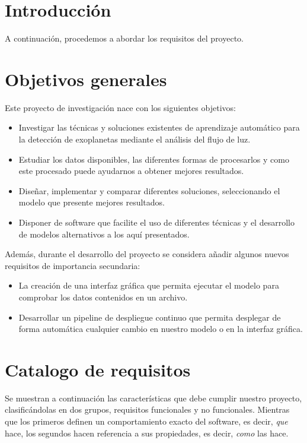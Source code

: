 
\section{Introducción}

A continuación, procedemos a abordar los requisitos del proyecto.

\section{Objetivos generales}

Este proyecto de investigación nace con los siguientes objetivos:

\begin{itemize}
    \item Investigar las técnicas y soluciones existentes de aprendizaje automático para la detección de exoplanetas mediante el análisis del flujo de luz.    
    \item Estudiar los datos disponibles, las diferentes formas de procesarlos y como este procesado puede ayudarnos a obtener mejores resultados.
    \item Diseñar, implementar y comparar diferentes soluciones, seleccionando el modelo que presente mejores resultados.
    \item Disponer de software que facilite el uso de diferentes técnicas y el desarrollo de modelos alternativos a los aquí presentados.
\end{itemize}

Además, durante el desarrollo del proyecto se considera añadir algunos nuevos requisitos de importancia secundaria:

\begin{itemize}    
    \item La creación de una interfaz gráfica que permita ejecutar el modelo para comprobar los datos contenidos en un archivo.
    \item Desarrollar un pipeline de despliegue continuo que permita desplegar de forma automática cualquier cambio en nuestro modelo o en la interfaz gráfica.
\end{itemize}

\section{Catalogo de requisitos}

Se muestran a continuación las características que debe cumplir nuestro proyecto, clasificándolas en dos grupos, requisitos funcionales y no funcionales. Mientras que los primeros definen un comportamiento exacto del software, es decir, \textit{que} hace, los segundos hacen referencia a sus propiedades, es decir, \textit{como} las hace.

